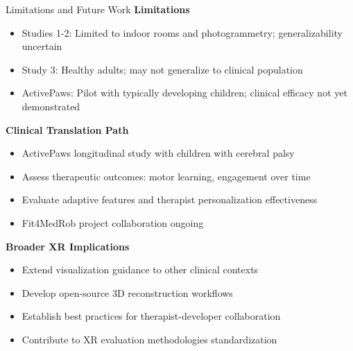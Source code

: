 \begin{frame}{Limitations and Future Work}
	\textbf{\textcolor{gbAqua}{Limitations}}
	
	\begin{itemize}
		\item Studies 1-2: Limited to indoor rooms and photogrammetry; generalizability uncertain
		\item Study 3: Healthy adults; may not generalize to clinical population
		\item ActivePaws: Pilot with typically developing children; clinical efficacy not yet demonstrated
	\end{itemize}
	
	\vspace{0.3cm}
	
	\textbf{\textcolor{gbAqua}{Clinical Translation Path}}
	
	\begin{itemize}
		\item ActivePaws longitudinal study with children with cerebral palsy
		\item Assess therapeutic outcomes: motor learning, engagement over time
		\item Evaluate adaptive features and therapist personalization effectiveness
		\item Fit4MedRob project collaboration ongoing
	\end{itemize}
	
	\vspace{0.3cm}
	
	\textbf{\textcolor{gbAqua}{Broader XR Implications}}
	
	\begin{itemize}
		\item Extend visualization guidance to other clinical contexts
		\item Develop open-source 3D reconstruction workflows
		\item Establish best practices for therapist-developer collaboration
		\item Contribute to XR evaluation methodologies standardization
	\end{itemize}
\end{frame}